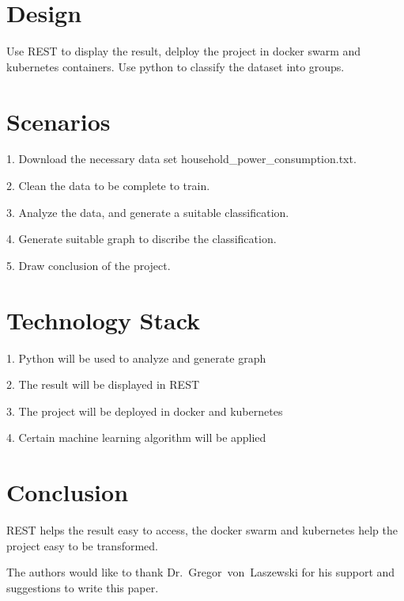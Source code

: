 \section{Design}

Use REST to display the result, delploy the project in docker swarm and kubernetes containers.
Use python to classify the dataset into groups.

\section{Scenarios}

1. Download the necessary data set household\_power\_consumption.txt\cite{editor00}.

2. Clean the data to be complete to train.

3. Analyze the data, and generate a suitable classification.

4. Generate suitable graph to discribe the classification.

5. Draw conclusion of the project.


\section{Technology Stack}

1. Python will be used to analyze and generate graph

2. The result will be displayed in REST

3. The project will be deployed in docker and kubernetes

4. Certain machine learning algorithm will be applied


\section{Conclusion}

REST helps the result easy to access, the docker swarm and kubernetes help the project easy to be transformed.


\begin{acks}

  The authors would like to thank Dr.~Gregor~von~Laszewski for his
  support and suggestions to write this paper.

\end{acks}



 

